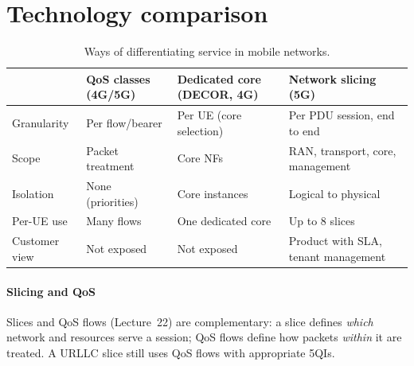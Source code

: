 \documentclass[11pt,a4paper]{article}
\begin{document}
\section{Technology comparison}
\begin{table}[htbp]
\centering\small
\caption{Ways of differentiating service in mobile networks.}\label{tab:cmp}
\begin{tabularx}{\linewidth}{@{}l Y Y Y@{}}
\toprule
{} & QoS classes (4G/5G) & Dedicated core (DECOR, 4G) & Network slicing (5G) \\
\midrule
Granularity    & Per flow/bearer                & Per UE (core selection)      & Per PDU session, end to end \\
Scope          & Packet treatment               & Core NFs                     & RAN, transport, core, management \\
Isolation      & None (priorities)              & Core instances               & Logical to physical \\
Per-UE use     & Many flows                     & One dedicated core           & Up to 8 slices \\
Customer view  & Not exposed                    & Not exposed                  & Product with SLA, tenant management \\
\bottomrule
\end{tabularx}
\end{table}

\paragraph{Slicing and QoS} Slices and QoS flows (Lecture~22) are complementary: a slice defines \emph{which} network and resources serve a
session; QoS flows define how packets \emph{within} it are treated. A URLLC slice still uses QoS flows with appropriate 5QIs.

\end{document}
